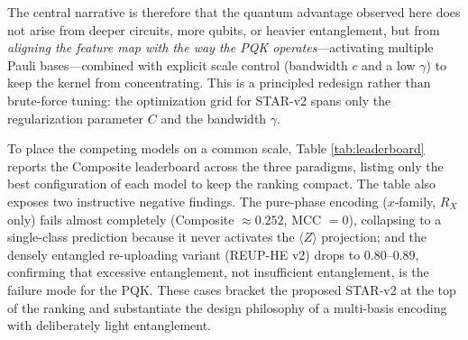 \documentclass{ieeeaccess}
\begin{document}
\begin{table}[htbp]
\caption{Design Evolution of the Proposed Quantum Feature Maps (QSVC, PCA = 12 qubits)}
\label{tab:proposed_quantum}
\centering
{}
\end{table}

The central narrative is therefore that the quantum advantage observed here does not arise from deeper circuits, more qubits, or heavier entanglement, but from \textit{aligning the feature map with the way the PQK operates}---activating multiple Pauli bases---combined with explicit scale control (bandwidth $c$ and a low $\gamma$) to keep the kernel from concentrating. This is a principled redesign rather than brute-force tuning: the optimization grid for STAR-v2 spans only the regularization parameter $C$ and the bandwidth $\gamma$.

To place the competing models on a common scale, Table \ref{tab:leaderboard} reports the Composite leaderboard across the three paradigms, listing only the best configuration of each model to keep the ranking compact. The table also exposes two instructive negative findings. The pure-phase encoding (\textit{$x$}-family, $R_X$ only) fails almost completely (Composite $\approx 0.252$, MCC $=0$), collapsing to a single-class prediction because it never activates the $\langle Z\rangle$ projection; and the densely entangled re-uploading variant (REUP-HE v2) drops to 0.80--0.89, confirming that excessive entanglement, not insufficient entanglement, is the failure mode for the PQK. These cases bracket the proposed STAR-v2 at the top of the ranking and substantiate the design philosophy of a multi-basis encoding with deliberately light entanglement.
\end{document}
